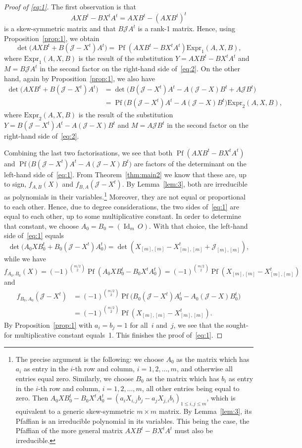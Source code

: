 \documentclass[12pt,reqno]{amsart}
\numberwithin{equation}{section}
\theoremstyle{definition}
\theoremstyle{remark}
\def\Pf{\operatorname{Pf}}
\def\Id{\operatorname{Id}}
\def\J{\mathcal J}
\begin{document}
\begin{proof}[Proof of \eqref{eq:1}]
The first observation is that
$$AXB^t-BX^tA^t=AXB^t-(AXB^t)^t$$
is a skew-symmetric matrix and that
$B\J A^t$ is a rank-1 matrix. Hence,
using Proposition~\ref{prop:1}, we obtain
$$
\det\bigl(AXB^t+B(\J -X^t)A^t\bigr)
=\Pf(AXB^t-BX^tA^t)\text{Expr}_1(A,X,B),
$$
where $\text{Expr}_1(A,X,B)$ is the result of the substitution
$Y=AXB^t-BX^tA^t$ and $M=B\J A^t$ in the second factor on the right-hand
side of~\eqref{eq:2}. On the other hand, again by Proposition~\ref{prop:1}, 
we also have
\begin{align*}
\det\bigl(AXB^t+B(\J -X^t)A^t\bigr)
&=
\det\bigl(B(\J -X^t)A^t-A(\J -X)B^t+A\J B^t\bigr)\\
&=
\Pf\bigl(B(\J -X^t)A^t-A(\J -X)B^t\bigr)\text{Expr}_2(A,X,B),
\end{align*}
where $\text{Expr}_2(A,X,B)$ is the result of the substitution
$Y=B(\J -X^t)A^t-A(\J -X)B^t$ and $M=A\J B^t$ in the second factor on the
right-hand side of~\eqref{eq:2}.

Combining the last two factorisations, we see that both
$\Pf(AXB^t-BX^tA^t)$ and $\Pf\bigl(B(\J -X^t)A^t-A(\J -X)B^t\bigr)$ are factors
of the determinant on the left-hand side of~\eqref{eq:1}. From 
Theorem~\ref{thm:main2} we know
that these are, up to sign, $f_{A,B}(X)$ and $f_{B,A}(\J -X^t)$. By
Lemma~\ref{lem:3}, both are
irreducible as polynomials in their variables.\footnote{The precise
argument is the following: we choose $A_0$ as the matrix which has
$a_i$ as entry in the $i$-th row and column, $i=1,2,\dots,m$, and
otherwise all entries equal zero. Similarly,
we choose $B_0$ as the matrix which has
$b_i$ as entry in the $i$-th row and column, $i=1,2,\dots,m$,
all other entries being equal to zero.
Then $A_0XB_0^t-B_0X^tA_0^t=(a_iX_{i,j}b_j-a_jX_{j,i}b_i)_{1\le i,j\le m}$,
which is equivalent to a generic skew-symmetric $m\times m$ matrix.
By Lemma~\ref{lem:3}, its Pfaffian is an irreducible polynomial in its
variables. This being the case, the Pfaffian of the more general
matrix $AXB^t-BX^tA^t$ must also be irreducible.}
Moreover, they are not equal or proportional to each other.
Hence, due to degree considerations, the two sides of~\eqref{eq:1} are
equal to each other, up to some multiplicative constant.
In order to determine that constant, we choose $A_0=B_0=(\Id_m\,O)$.
With that choice, the left-hand side of~\eqref{eq:1} equals
$$\det\bigl(A_0XB_0^t+B_0(\J-X^t)A_0^t\bigr)=
\det(X_{[m],[m]}-X_{[m],[m]}^t+\J_{[m],[m]}),$$
while we have
$$
f_{A_0,B_0}(X)=(-1)^{\binom {m/2}2}\Pf(A_0XB_0^t-B_0X^tA_0^t)
=(-1)^{\binom {m/2}2}\Pf(X_{[m],[m]}-X_{[m],[m]}^t)
$$
and
\begin{align*}
f_{B_0,A_0}(\J-X^t)&=(-1)^{\binom {m/2}2}
\Pf\bigl(B_0(\J-X^t)A_0^t-A_0(\J-X)B_0^t\bigr)\\
&=(-1)^{\binom {m/2}2}\Pf(X_{[m],[m]}-X_{[m],[m]}^t).
\end{align*}
By Proposition~\ref{prop:1} with $a_i=b_j=1$ for all~$i$ and~$j$,
we see that the sought-for multiplicative constant equals~1.
This finishes the proof of~\eqref{eq:1}.
\end{proof}
\end{document}
